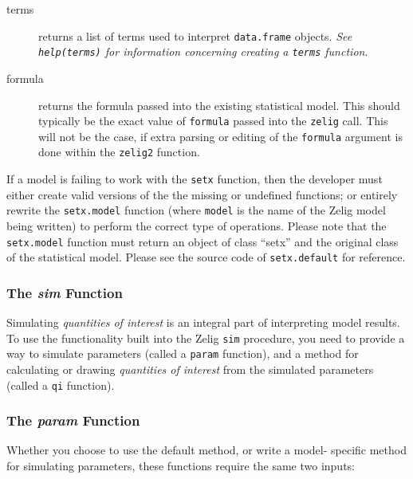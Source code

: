 \begin{description}
	\item[terms]{returns a list of terms used to interpret {\tt data.frame} objects.  \emph{See {\tt help(terms)} for information concerning creating a {\tt terms} function}.}
	\item[formula]{returns the formula passed into the existing statistical model.  This should typically be the exact value of {\tt formula} passed into the {\tt zelig} call.  This will not be the case, if extra parsing or editing of the {\tt formula} argument is done within the {\tt zelig2} function.}
\end{description}

If a model is failing to work with the {\tt setx} function, then the developer must either create valid versions of the the missing or undefined functions; or entirely rewrite the {\tt setx.model} function (where {\tt model} is the name of the Zelig model being written) to perform the correct type of operations.  Please note that the {\tt setx.model} function must return an object of class ``setx'' and the original class of the statistical model.  Please see the source code of {\tt setx.default} for reference.

\subsubsection{The \emph{sim} Function}

Simulating \emph{quantities of interest} is an integral part of interpreting model results. To use the functionality built into the Zelig {\tt sim} procedure, you need to provide a way to simulate parameters (called a {\tt param} function), and a method for calculating or drawing \emph{quantities of interest} from the simulated parameters (called a {\tt qi} function).


\subsubsection{The \emph{param} Function}
Whether you choose to use the default method, or write a model- specific method for simulating parameters, these functions require the same two inputs:

